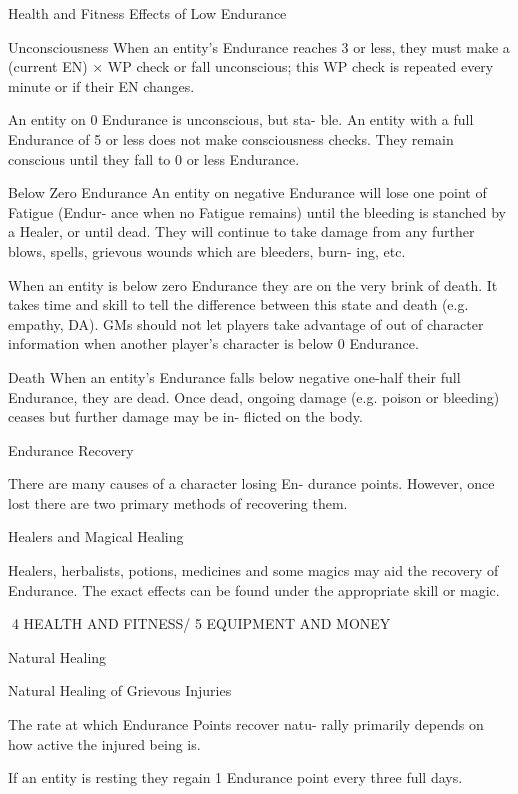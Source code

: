 \begin{Chapter}{Health and Fitness}
Effects of Low Endurance 

Unconsciousness  When  an  entity’s  Endurance 
reaches 3 or less, they must make a (current EN) × 
WP  check  or  fall  unconscious;  this  WP  check  is 
repeated every minute or if their EN changes. 

An  entity  on  0  Endurance  is  unconscious,  but  sta-
ble.  An  entity  with  a  full  Endurance  of  5  or  less 
does not make consciousness checks. They remain 
conscious until they fall to 0 or less Endurance. 

Below  Zero  Endurance  An  entity  on  negative 
Endurance  will  lose  one  point  of  Fatigue  (Endur-
ance when no Fatigue remains) until the bleeding is 
stanched  by  a  Healer,  or  until  dead.  They  will 
continue  to  take  damage  from  any  further  blows, 
spells,  grievous  wounds  which  are  bleeders,  burn-
ing, etc. 

When  an  entity  is  below  zero  Endurance  they  are 
on the very brink of death. It takes time and skill to 
tell the difference between this state and death (e.g. 
empathy,  DA).  GMs  should  not  let  players  take 
advantage  of  out  of  character  information  when 
another player’s character is below 0 Endurance. 

Death  When  an  entity’s  Endurance  falls  below 
negative  one-half  their  full  Endurance,  they  are 
dead.  Once  dead,  ongoing  damage  (e.g.  poison  or 
bleeding)  ceases  but  further  damage  may  be  in-
flicted on the body. 

Endurance Recovery 

There  are  many  causes  of  a  character  losing  En-
durance  points.  However,  once  lost  there  are  two 
primary methods of recovering them. 

Healers and Magical Healing 

Healers,  herbalists,  potions,  medicines  and  some 
magics  may  aid  the  recovery  of  Endurance.  The 
exact  effects  can  be  found  under  the  appropriate 
skill or magic. 

4 HEALTH AND FITNESS/ 5 EQUIPMENT AND MONEY 

Natural Healing 

Natural Healing of Grievous Injuries 

The  rate  at  which  Endurance  Points  recover  natu-
rally  primarily  depends  on  how  active  the  injured 
being is. 

If an entity is resting they regain 1 Endurance point 
every three full days. 


\end{Chapter}
